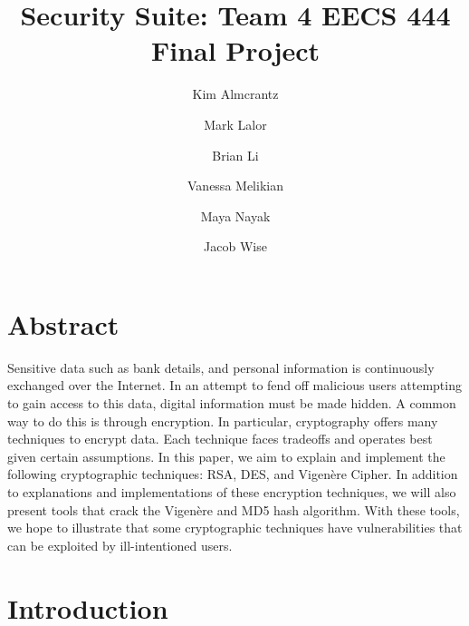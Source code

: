 \documentclass[acmlarge]{acmart}
\begin{document}
\title{Security Suite: Team 4 EECS 444 Final Project}

\author{Kim Almcrantz}

\author{Mark Lalor}

\author{Brian Li}

\author{Vanessa Melikian}

\author{Maya Nayak}

\author{Jacob Wise}


\maketitle


\section{Abstract}
Sensitive data such as bank details, and personal information is continuously exchanged over the Internet. In an attempt to fend off malicious users attempting to gain access to this data, digital information must be made hidden. A common way to do this is through encryption. In particular, cryptography offers many techniques to encrypt data. Each technique faces tradeoffs and operates best given certain assumptions. In this paper, we aim to explain and implement the following cryptographic techniques: RSA, DES, and Vigen\`{e}re Cipher. In addition to explanations and implementations of these encryption techniques, we will also present tools that crack the Vigen\`{e}re and MD5 hash algorithm. With these tools, we hope to illustrate that some cryptographic techniques have vulnerabilities that can be exploited by ill-intentioned users.


\section{Introduction}\label{sec:intro}
\end{document}
